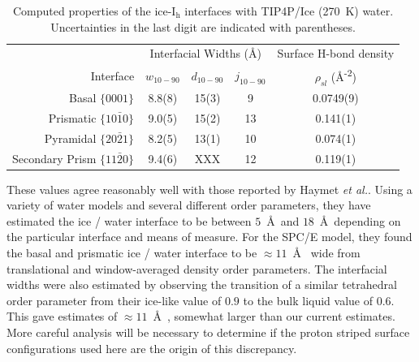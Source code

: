 \begin{table}[h]
\centering
\caption{Computed properties of the
  ice-I$_\mathrm{h}$ interfaces with TIP4P/Ice (270~K) water. Uncertainties in the last digit are indicated with
  parentheses. \label{tab:propsTIP4P}}
\begin{tabular}{r|ccc|c}  
  \toprule
  & \multicolumn{3}{c|}{Interfacial Widths (\AA)} & 
                                                    Surface H-bond
                                                    density \\
  Interface & $w_\mathrm{10-90}$ &  $d_\mathrm{10-90}$ & $j_\mathrm{10-90}$ & $\rho_{sl}$ (\AA\textsuperscript{-2}) \\ 
  \midrule
  Basal  $\{0001\}$                 & 8.8(8) & 15(3) & 9   & 0.0749(9)  \\
  Prismatic  $\{10\bar{1}0\}$       & 9.0(5) &15(2) & 13   & 0.141(1)  \\
  Pyramidal  $\{20\bar{2}1\}$       & 8.2(5) & 13(1) & 10   & 0.074(1)  \\
  Secondary Prism  $\{11\bar{2}0\}$ & 9.4(6) & XXX& 12   & 0.119(1) \\
  \bottomrule
\end{tabular}
\end{table}

These values agree reasonably well with those reported by Haymet
\textit{et
  al.}.\cite{Karim1988,Karim1990,Hayward2001,Bryk2002,Hayward2002,Bryk2004}
Using a variety of water models and several different order
parameters, they have estimated the ice / water interface to be
between $5$~\AA~and $18$~\AA~depending on the particular interface and
means of measure.  For the SPC/E model, they found the basal and
prismatic ice / water interface to be $\approx 11$~\AA~ wide from
translational and window-averaged density order parameters. The
interfacial widths were also estimated by observing the transition of
a similar tetrahedral order parameter from their ice-like value of
$0.9$ to the bulk liquid value of $0.6$. This gave estimates of
$\approx 11$~\AA~, somewhat larger than our current estimates. More
careful analysis will be necessary to determine if the proton striped
surface configurations used here are the origin of this discrepancy.

